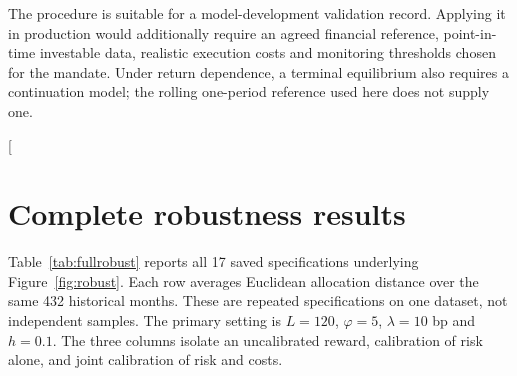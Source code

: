 \documentclass[sigconf,anonymous,review]{acmart}
\begin{document}
The procedure is suitable for a model-development validation record. Applying it in production would additionally require an agreed financial reference, point-in-time investable data, realistic execution costs and monitoring thresholds chosen for the mandate. Under return dependence, a terminal equilibrium also requires a continuation model; the rolling one-period reference used here does not supply one.



\appendix
\twocolumn[{
\section{Complete robustness results}\label{app:robustness}
Table~\ref{tab:fullrobust} reports all 17 saved specifications underlying Figure~\ref{fig:robust}. Each row averages Euclidean allocation distance over the same 432 historical months. These are repeated specifications on one dataset, not independent samples. The primary setting is $L=120$, $\varphi=5$, $\lambda=10$ bp and $h=0.1$. The three columns isolate an uncalibrated reward, calibration of risk alone, and joint calibration of risk and costs.

}
\end{document}
